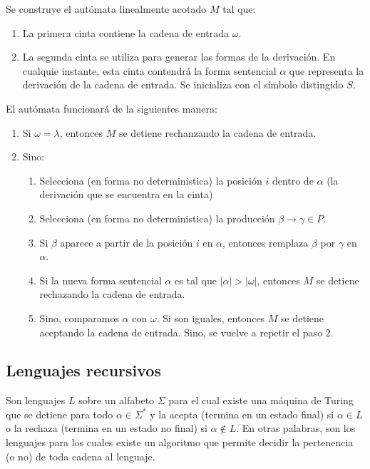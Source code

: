 \begin{demo}[0.8\textwidth]
  Se construye el autómata linealmente acotado \(M\) tal que:
  \begin{enumerate}
    \item La primera cinta contiene la cadena de entrada \textcentoldstyle\(\omega\)\textdollar.
    \item La segunda cinta se utiliza para generar las formas de la derivación. En cualquie instante, esta cinta contendrá la forma sentencial \(\alpha\) que representa la derivación de la cadena de entrada. Se inicializa con el símbolo distingido \(S\).
  \end{enumerate}

  El autómata funcionará de la siguientes manera:
  \begin{enumerate}
    \item Si \(\omega=\lambda\), entonces \(M\) se detiene rechanzando la cadena de entrada.
    \item Sino:
          \begin{enumerate}
            \item Selecciona (en forma no deterministica) la posición \(i\) dentro de \(\alpha\) (la derivación que se encuentra en la cinta)
            \item Selecciona (en forma no deterministica) la producción \(\beta\to\gamma\in P\).
            \item Si \(\beta\) aparece a partir de la posición \(i\) en \(\alpha\), entonces remplaza \(\beta\) por \(\gamma\) en \(\alpha\).
            \item Si la nueva forma sentencial \(\alpha\) es tal que \(|\alpha| > |\omega|\), entonces \(M\) se detiene rechazando la cadena de entrada.
            \item Sino, comparamos \(\alpha\) con \(\omega\). Si son iguales, entonces \(M\) se detiene aceptando la cadena de entrada. Sino, se vuelve a repetir el paso 2.
          \end{enumerate}
  \end{enumerate}
\end{demo}

\subsection{Lenguajes recursivos}
Son lenguajes \(L\) sobre un alfabeto \(\Sigma\) para el cual existe una máquina de Turing que se detiene para todo \(\alpha\in\Sigma^*\) y la acepta (termina en un estado final) si \(\alpha\in L\) o la rechaza (termina en un estado no final) si \(\alpha\notin L\). En otras palabras, son los lenguajes para los cuales existe un algoritmo que permite decidir la pertenencia (o no) de toda cadena al lenguaje.

